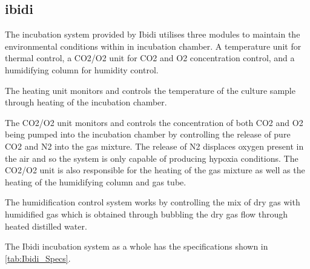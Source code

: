 \documentclass[class=report,11pt,crop=false]{standalone}
\begin{document}
\subsection{ibidi}
The incubation system provided by Ibidi utilises three modules to maintain the environmental conditions within in incubation chamber. A temperature unit for thermal control, a CO2/O2 unit for CO2 and O2 concentration control, and a humidifying column for humidity control.

The heating unit monitors and controls the temperature of the culture sample through heating of the incubation chamber.

The CO2/O2 unit monitors and controls the concentration of both CO2 and O2 being pumped into the incubation chamber by controlling the release of pure CO2 and N2 into the gas mixture. The release of N2 displaces oxygen present in the air and so the system is only capable of producing hypoxia conditions. The CO2/O2 unit is also responsible for the heating of the gas mixture as well as the heating of the humidifying column and gas tube.

The humidification control system works by controlling the mix of dry gas with humidified gas which is obtained through bubbling the dry gas flow through heated distilled water.

The Ibidi incubation system as a whole has the specifications shown in \autoref*{tab:Ibidi_Specs}.
\end{document}
